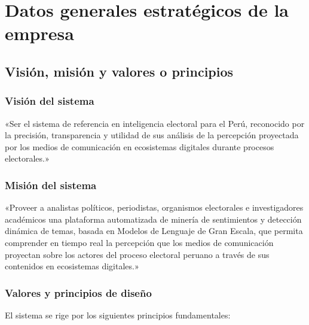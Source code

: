\section{Datos generales estratégicos de la empresa}

\subsection{Visión, misión y valores o principios}

\subsubsection*{Visión del sistema}

«Ser el sistema de referencia en inteligencia electoral para el Perú, reconocido por la precisión, transparencia y utilidad de sus análisis de la percepción proyectada por los medios de comunicación en ecosistemas digitales durante procesos electorales.»

\subsubsection*{Misión del sistema}

«Proveer a analistas políticos, periodistas, organismos electorales e investigadores académicos una plataforma automatizada de minería de sentimientos y detección dinámica de temas, basada en Modelos de Lenguaje de Gran Escala, que permita comprender en tiempo real la percepción que los medios de comunicación proyectan sobre los actores del proceso electoral peruano a través de sus contenidos en ecosistemas digitales.»

\subsubsection*{Valores y principios de diseño}

El sistema se rige por los siguientes principios fundamentales:

